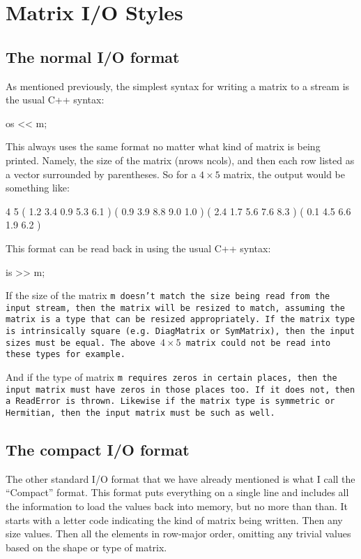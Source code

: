 
\section{Matrix I/O Styles}
\label{IOStyle}

\subsection{The normal I/O format}

As mentioned previously, the simplest syntax for writing a matrix to a stream is the usual C++ syntax:
\begin{tmvcode}
os << m;
\end{tmvcode}

This always uses the same format no matter what kind of matrix is being printed.  Namely, the size of the matrix (nrows ncols), and then each row listed as a vector surrounded by parentheses.  So for a $4\times5$ matrix, the output would be something like:
\begin{tmvcode}
4 5
( 1.2  3.4  0.9  5.3  6.1 )
( 0.9  3.9  8.8  9.0  1.0 )
( 2.4  1.7  5.6  7.6  8.3 )
( 0.1  4.5  6.6  1.9  6.2 )
\end{tmvcode}

This format can be read back in using the usual C++ syntax:
\begin{tmvcode}
is >> m;
\end{tmvcode}
If the size of the matrix \tt{m} doesn't match the size being read from the input stream, then the matrix will be resized to match, assuming the matrix is a type that can be resized appropriately.  If the matrix type is intrinsically square (e.g. \tt{DiagMatrix} or \tt{SymMatrix}), then the input sizes must be equal.  The above $4\times5$ matrix could not be read into these types for example.

And if the type of matrix \tt{m} requires zeros in certain places, then the input matrix must have zeros in those places too.  If it does not, then a \tt{ReadError} is thrown.  Likewise if the matrix type is symmetric or Hermitian, then the input matrix must be such as well.

\subsection{The compact I/O format}

The other standard I/O format that we have already mentioned is what I call the ``Compact'' format.  This format puts everything on a single line and includes all the information to load the values back into memory, but no more than than.  It starts with a letter code indicating the kind of matrix being written.  Then any size values.  Then all the elements in row-major order, omitting any trivial values based on the shape or type of matrix.

